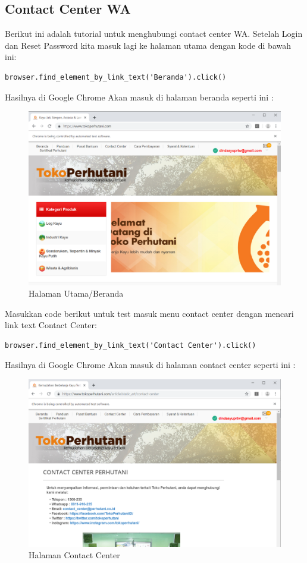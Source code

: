 \newpage
\subsection{Contact Center WA}
Berikut ini adalah tutorial untuk menghubungi contact center WA. Setelah Login dan Reset Password kita masuk lagi ke halaman utama dengan kode di bawah ini:

\begin{verbatim}
browser.find_element_by_link_text('Beranda').click()
\end{verbatim}

Hasilnya  di Google Chrome Akan masuk di halaman beranda seperti ini : 

\begin{figure}[h]
	\centering
	\includegraphics[scale=0.28]{figures/3HalUtama}
	\caption{Halaman Utama/Beranda}
\end{figure}

Masukkan code berikut untuk test masuk menu contact center dengan mencari link text Contact Center:

\begin{verbatim}
browser.find_element_by_link_text('Contact Center').click()
\end{verbatim}

Hasilnya  di Google Chrome Akan masuk di halaman contact center seperti ini : 

\begin{figure}[h]
	\centering
	\includegraphics[scale=0.29]{figures/5kontak}
	\caption{Halaman Contact Center}
\end{figure}

